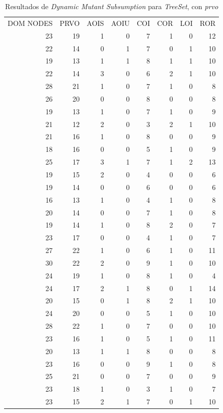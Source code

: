 \begin{table}[]
	\caption{Resultados de \emph{Dynamic Mutant Subsumption} para \emph{TreeSet}, con \emph{prvo}}
	\label{tables.results.subsumption.treeset.prvo}
	\centering
	\scriptsize
	\def\arraystretch{0.95}
	\setlength\tabcolsep{0.5mm}
	\begin{tabular}{rrrrrrrr}
		DOM NODES & PRVO & AOIS & AOIU & COI & COR & LOI & ROR \\
		23 & 19 & 1 & 0 & 7 & 1 & 0 & 12 \\
		22 & 14 & 0 & 1 & 7 & 0 & 1 & 10 \\
		19 & 13 & 1 & 1 & 8 & 1 & 1 & 10 \\
		22 & 14 & 3 & 0 & 6 & 2 & 1 & 10 \\
		28 & 21 & 1 & 0 & 7 & 1 & 0 & 8 \\
		26 & 20 & 0 & 0 & 8 & 0 & 0 & 8 \\
		19 & 13 & 1 & 0 & 7 & 1 & 0 & 9 \\
		21 & 12 & 2 & 0 & 3 & 2 & 1 & 10 \\
		21 & 16 & 1 & 0 & 8 & 0 & 0 & 9 \\
		18 & 16 & 0 & 0 & 5 & 1 & 0 & 9 \\
		25 & 17 & 3 & 1 & 7 & 1 & 2 & 13 \\
		19 & 15 & 2 & 0 & 4 & 0 & 0 & 6 \\
		19 & 14 & 0 & 0 & 6 & 0 & 0 & 6 \\
		16 & 13 & 1 & 0 & 4 & 1 & 0 & 8 \\
		20 & 14 & 0 & 0 & 7 & 1 & 0 & 8 \\
		19 & 14 & 1 & 0 & 8 & 2 & 0 & 7 \\
		23 & 17 & 0 & 0 & 4 & 1 & 0 & 7 \\
		27 & 22 & 1 & 0 & 6 & 1 & 0 & 11 \\
		30 & 22 & 2 & 0 & 9 & 1 & 0 & 10 \\
		24 & 19 & 1 & 0 & 8 & 1 & 0 & 4 \\
		24 & 17 & 2 & 1 & 8 & 0 & 1 & 14 \\
		20 & 15 & 0 & 1 & 8 & 2 & 1 & 10 \\
		24 & 20 & 0 & 0 & 5 & 1 & 0 & 10 \\
		28 & 22 & 1 & 0 & 7 & 0 & 0 & 10 \\
		23 & 16 & 1 & 0 & 5 & 1 & 0 & 11 \\
		20 & 13 & 1 & 1 & 8 & 0 & 0 & 8 \\
		23 & 16 & 0 & 0 & 9 & 1 & 0 & 8 \\
		25 & 21 & 0 & 0 & 7 & 0 & 0 & 9 \\
		23 & 18 & 1 & 0 & 3 & 1 & 0 & 7 \\
		23 & 15 & 2 & 1 & 7 & 0 & 1 & 10
	\end{tabular}
\end{table}

